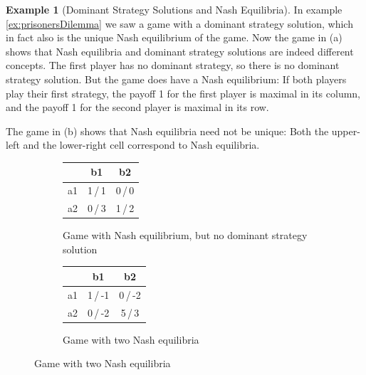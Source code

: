 \documentclass[a4paper,DIV=11]{scrreprt}
\theoremstyle{definition}
\newtheorem{ex}[thm]{Example} %
\begin{document}
    \begin{ex}[Dominant Strategy Solutions and Nash Equilibria]
        In example \ref{ex:prisonersDilemma} we saw a game with a dominant strategy solution, which in fact also is the unique Nash equilibrium of the game.
        Now the game in (a)
        shows that Nash equilibria and dominant strategy solutions are indeed different concepts. The first player has no dominant strategy, so there is no dominant strategy solution. But the game does have a Nash equilibrium: If both players play their first strategy, the payoff 1 for the first player is maximal in its column, and the payoff 1 for the second player is maximal in its row.
        
        The game in (b)
        shows that Nash equilibria need not be unique: Both the upper-left and the lower-right cell correspond to Nash equilibria.
        
        \begin{figure}[h]
            \centering
            \begin{subfigure}[t]{0.49\textwidth}
                \centering
                \begin{tabular}{c|c|c|}
                	   &   b1    &   b2    \\ \hline
                	a1 & 1\,/\,1 & 0\,/\,0 \\ \hline
                	a2 & 0\,/\,3 & 1\,/\,2 \\ \hline
                \end{tabular}
                \caption{Game with Nash equilibrium, but no dominant strategy solution}
                \label{fig:nashEquilibriumNoDominantStrategy}
            \end{subfigure}
            \begin{subfigure}[t]{0.49\textwidth}
                \centering
                \begin{tabular}{c|c|c|}
                    &   b1    &   b2    \\ \hline
                    a1 & 1\,/\,-1 & 0\,/\,-2 \\ \hline
                    a2 & 0\,/\,-2 & 5\,/\,3 \\ \hline
                \end{tabular}
                \caption{Game with two Nash equilibria}   
                \label{fig:twoNashEquilibria}
            \end{subfigure}
        \end{figure}
    \end{ex}
    
\end{document}
